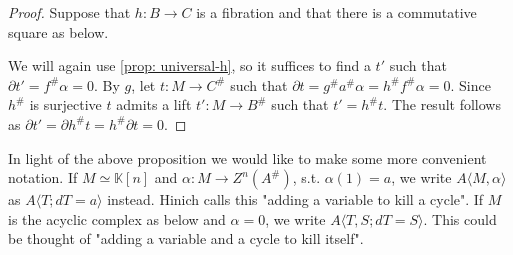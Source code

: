 \documentclass[../thesis.tex]{subfiles}
\begin{document}
\begin{proof}
                Suppose that $h: B \rightarrow C$ is a fibration and that there is a commutative square as below.
                \begin{center}
                \end{center}

                We will again use \ref{prop: universal-h}, so it suffices to find a $t'$ such that $\partial t' = f^\#\alpha = 0$. By $g$, let $t : M \rightarrow C^\#$ such that $\partial t = g^\#a^\#\alpha = h^\# f^\# \alpha = 0$. Since $h^\#$ is surjective $t$ admits a lift $t' : M \rightarrow B^\#$ such that $t' = h^\#t$. The result follows as $\partial t' = \partial h^\#t = h^\#\partial t = 0$.

            \end{proof}

            In light of the above proposition we would like to make some more convenient notation. If $M\simeq \mathbb{K}[n]$ and $\alpha: M \rightarrow Z^n(A^\#)$, s.t. $\alpha(1) = a$, we write $A\langle M,\alpha\rangle$ as $A\langle T; dT = a\rangle$ instead. Hinich calls this "adding a variable to kill a cycle". If $M$ is the acyclic complex as below and $\alpha = 0$, we write $A\langle T, S; dT = S\rangle$. This could be thought of "adding a variable and a cycle to kill itself".

            \begin{center}
            \end{center}
\end{document}
